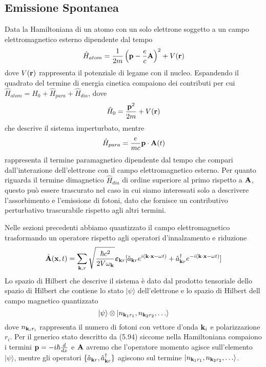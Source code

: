 \subsection{Emissione Spontanea}

Data la Hamiltoniana di un atomo con un solo elettrone soggetto a un campo elettromagnetico esterno dipendente dal tempo 
\begin{equation*}
	\hat{H}_{atom} = \frac{1}{2m} \left(\bold{p} - \frac{e}{c}\bold{A}\right)^2 +V(\bold{r})
\end{equation*}
dove $V(\bold{r})$ rappresenta il potenziale di legame con il nucleo. Espandendo il quadrato del termine di energia cinetica compaiono dei contributi per cui $\hat{H}_{atom} = \hat{H}_0 + \hat{H}_{para} + \hat{H}_{dia}$, dove 
\begin{equation*}
	\hat{H}_0 = \frac{\bold{p}^2}{2m} + V(\bold{r})
\end{equation*}
che descrive il sistema imperturbato, mentre 
\begin{equation*}
	\hat{H}_{para} = \frac{e}{mc}\bold{p} \cdot \bold{A}(t)
\end{equation*}
rappresenta il termine paramagnetico dipendente dal tempo che compari dall'interazione dell'elettrone con il campo elettromagnetico esterno. Per quanto riguarda il termine dimagnetico $\hat{H}_{dia} $ di ordine superiore al primo rispetto a $\bold{A}$, questo pu\`o essere trascurato nel caso in cui siamo interessati solo a descrivere l'assorbimento e l'emissione di fotoni, dato che fornisce un contributivo perturbativo trascurabile rispetto agli altri termini.

Nelle sezioni precedenti abbiamo quantizzato il campo elettromagnetico trasformando un operatore rispetto agli operatori d'innalzamento e riduzione 
\begin{equation}
	\hat{\bold{A}}(\bold{x},t)= \sum_{\bold{k},r} \sqrt{\frac{\hbar c^2}{2V \omega_{\bold{k}}}} \boldsymbol{\varepsilon}_{\bold{k}r} [\hat{a}_{\bold{k}r} e^{i(\bold{k}\cdot \bold{x} -\omega t)}+\hat{a}_{\bold{k}r}^{\dag}e^{-i(\bold{k}\cdot \bold{x}-\omega t)}]
\end{equation}
Lo spazio di Hilbert  che descrive il sistema \`e dato dal prodotto tensoriale dello spazio di Hilbert che contiene lo stato $|\psi \rangle$ dell'elettrone e lo spazio di Hilbert dell campo magnetico quantizzato
\begin{equation}
	|\psi \rangle \otimes |n_{\bold{k}_1r_1},n_{\bold{k}_2r_2},\ldots \rangle 
\end{equation} 
dove $n_{\bold{k}_i r_i}$ rappresenta il numero di fotoni con vettore d'onda $\bold{k}_i$ e polarizzazione $r_i$.
Per il generico stato descritto da (5.94) siccome nella Hamiltoniana compaiono i termini $\bold{p} = -i \hbar \frac{d}{dx}$ e $\bold{A}$ avremo che l'operatore momento agisce sull'elemento $|\psi \rangle$, mentre gli operatori $\{\hat{a}_{\bold{k}r},\hat{a}_{\bold{k}r}^{\dag}\}$ agiscono sul termine $|n_{\bold{k}_1r_1},n_{\bold{k}_2r_2},\ldots \rangle$. 

